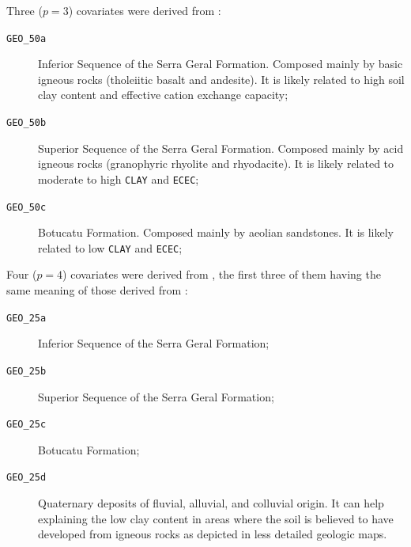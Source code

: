 
Three ($p = 3$) covariates were derived from \geoOld{}:

\begin{description}
 \item[\texttt{GEO\_50a}] Inferior Sequence of the Serra Geral Formation. Composed mainly by basic 
 igneous rocks (tholeiitic basalt and andesite). It is likely related to high soil clay content and effective 
cation exchange capacity;
 
 \item[\texttt{GEO\_50b}] Superior Sequence of the Serra Geral Formation. Composed mainly by acid 
 igneous rocks (granophyric rhyolite and rhyodacite). It is likely related to moderate to 
 high \texttt{CLAY} and \texttt{ECEC};
 
 \item[\texttt{GEO\_50c}] Botucatu Formation. Composed mainly by aeolian sandstones. It is likely  related to 
low \texttt{CLAY} and \texttt{ECEC};
\end{description}

Four ($p = 4$) covariates were derived from \geoNew{}, the first three of them having the same meaning 
of those derived from \geoOld{}:

\begin{description}
 \item[\texttt{GEO\_25a}] Inferior Sequence of the Serra Geral Formation;
 
 \item[\texttt{GEO\_25b}] Superior Sequence of the Serra Geral Formation;
 
 \item[\texttt{GEO\_25c}] Botucatu Formation;
 
 \item[\texttt{GEO\_25d}] Quaternary deposits of fluvial, alluvial, and colluvial origin. It can help 
explaining the low clay content in areas where the soil is believed to have developed from igneous rocks as 
depicted in less detailed geologic maps.
\end{description}

